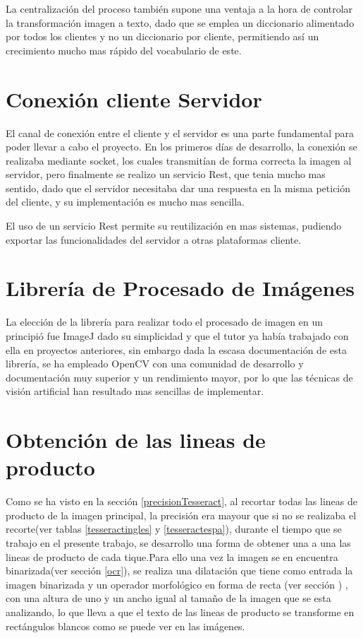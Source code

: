 La centralización del proceso también supone una ventaja a la hora de controlar la transformación imagen a texto, dado que se emplea un diccionario alimentado por todos los clientes y no un diccionario por cliente, permitiendo así un crecimiento mucho mas rápido del vocabulario de este.

\section{Conexión cliente Servidor}
El canal de conexión entre el cliente y el servidor es una parte fundamental para poder llevar a cabo el proyecto.
En los primeros días de desarrollo, la conexión se realizaba mediante socket, los cuales transmitían de forma correcta la imagen al servidor, pero finalmente se realizo un servicio Rest, que tenia mucho mas sentido, dado que el servidor necesitaba dar una respuesta en la misma petición del cliente, y su implementación es mucho mas sencilla.

El uso de un servicio Rest permite su reutilización en mas sistemas, pudiendo exportar las funcionalidades del servidor a otras plataformas cliente.

\section{Librería de Procesado de Imágenes}
La elección de la librería para realizar todo el procesado de imagen en un principió fue ImageJ dado su simplicidad y que el tutor ya había trabajado con ella en proyectos anteriores, sin embargo dada la escasa documentación de esta librería, se ha empleado OpenCV con una comunidad de desarrollo y documentación muy superior y un rendimiento mayor, por lo que las técnicas de visión artificial   han resultado mas sencillas de implementar.

\section{Obtención de las lineas de producto}

Como se ha visto en la sección \ref{precisionTesseract}, al recortar todas las lineas de producto de la imagen principal, la precisión era mayour que si no se realizaba el recorte(ver tablas \ref{tesseractingles} y \ref{tesseractespa}), durante el tiempo que se trabajo en el presente trabajo, se desarrollo una forma de obtener una a una las lineas de producto de cada tique.Para ello una vez la imagen se en encuentra binarizada(ver sección \ref{ocr}), se realiza una dilatación que tiene como entrada la imagen binarizada y un operador morfológico en forma de recta (ver sección ) , con una altura de uno y un ancho igual al tamaño de la imagen que se esta analizando, lo que lleva a que el texto de las lineas de producto se transforme en rectángulos blancos como se puede ver en las imágenes.

